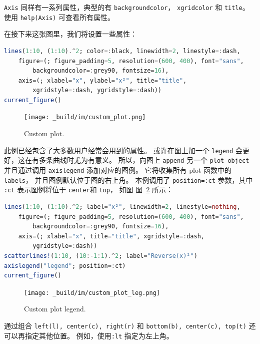 \documentclass[
  notoc %
]{tufte-book}
\newcommand{\passthrough}[1]{#1}
\begin{document}
\passthrough{\lstinline!Axis!} 同样有一系列属性，典型的有
\passthrough{\lstinline!backgroundcolor!}，
\passthrough{\lstinline!xgridcolor!} 和
\passthrough{\lstinline!title!}。 使用
\passthrough{\lstinline!help(Axis)!} 可查看所有属性。

在接下来这张图里，我们将设置一些属性：

\begin{lstlisting}[language=Julia]
lines(1:10, (1:10).^2; color=:black, linewidth=2, linestyle=:dash,
    figure=(; figure_padding=5, resolution=(600, 400), font="sans",
        backgroundcolor=:grey90, fontsize=16),
    axis=(; xlabel="x", ylabel="x²", title="title",
        xgridstyle=:dash, ygridstyle=:dash))
current_figure()
\end{lstlisting}

\begin{figure}
\hypertarget{fig:custom_plot}{%
\centering
\texttt{[image: \_build/im/custom\_plot.png]}
\caption{Custom plot.}\label{fig:custom_plot}
}
\end{figure}

此例已经包含了大多数用户经常会用到的属性。 或许在图上加一个
\passthrough{\lstinline!legend!} 会更好，这在有多条曲线时尤为有意义。
所以，向图上 \passthrough{\lstinline!append!} 另一个
\passthrough{\lstinline!plot object!} 并且通过调用
\passthrough{\lstinline!axislegend!} 添加对应的图例。 它将收集所有 plot
函数中的 \passthrough{\lstinline!labels!}， 并且图例默认位于图的右上角。
本例调用了 \passthrough{\lstinline!position=:ct!} 参数，其中
\passthrough{\lstinline!:ct!} 表示图例将位于
\passthrough{\lstinline!center!}和 \passthrough{\lstinline!top!}， 如图
图~\ref{fig:custom_plot_leg} 所示：

\begin{lstlisting}[language=Julia]
lines(1:10, (1:10).^2; label="x²", linewidth=2, linestyle=nothing,
    figure=(; figure_padding=5, resolution=(600, 400), font="sans",
        backgroundcolor=:grey90, fontsize=16),
    axis=(; xlabel="x", title="title", xgridstyle=:dash,
        ygridstyle=:dash))
scatterlines!(1:10, (10:-1:1).^2; label="Reverse(x)²")
axislegend("legend"; position=:ct)
current_figure()
\end{lstlisting}

\begin{figure}
\hypertarget{fig:custom_plot_leg}{%
\centering
\texttt{[image: \_build/im/custom\_plot\_leg.png]}
\caption{Custom plot legend.}\label{fig:custom_plot_leg}
}
\end{figure}

通过组合 \passthrough{\lstinline!left(l), center(c), right(r)!} 和
\passthrough{\lstinline!bottom(b), center(c), top(t)!}
还可以再指定其他位置。 例如，使用\passthrough{\lstinline!:lt!}
指定为左上角。
\end{document}

